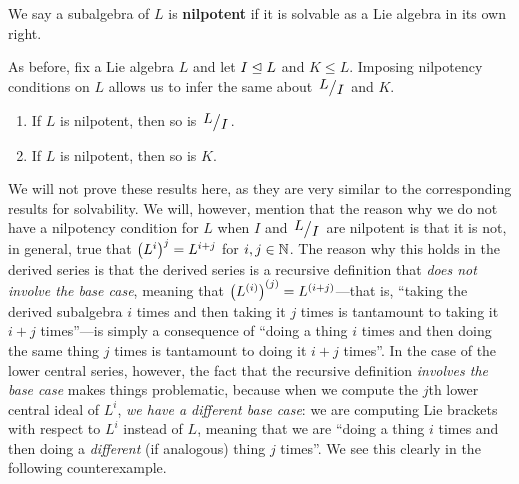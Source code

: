 \begin{boxdefinition}
    We say a subalgebra of $L$ is \textbf{nilpotent} if it is solvable as a Lie algebra in its own right.
\end{boxdefinition}

As before, fix a Lie algebra $L$ and let $I \trianglelefteq L$ and $K \leq L$. Imposing nilpotency conditions on $L$ allows us to infer the same about $\quotient{L}{I}$ and $K$.

\begin{boxproposition}
    \hfill
    \begin{enumerate}[label = \normalfont\arabic*., noitemsep]
        \item If $L$ is nilpotent, then so is $\quotient{L}{I}$.
        \item If $L$ is nilpotent, then so is $K$.
    \end{enumerate}
\end{boxproposition}

We will not prove these results here, as they are very similar to the corresponding results for solvability. We will, however, mention that the reason why we do not have a nilpotency condition for $L$ when $I$ and $\quotient{L}{I}$ are nilpotent is that it is not, in general, true that $\left( L^i \right)^j = L^{i + j}$ for $i, j \in \mathbb{N}$. The reason why this holds in the derived series is that the derived series is a recursive definition that \textit{does not involve the base case}, meaning that $\left( L^{(i)} \right)^{(j)} = L^{\left( i + j \right)}$---that is, ``taking the derived subalgebra $i$ times and then taking it $j$ times is tantamount to taking it $i + j$ times''---is simply a consequence of ``doing a thing $i$ times and then doing the same thing $j$ times is tantamount to doing it $i + j$ times''. In the case of the lower central series, however, the fact that the recursive definition \textit{involves the base case} makes things problematic, because when we compute the $j$th lower central ideal of $L^i$, \textit{we have a different base case}: we are computing Lie brackets with respect to $L^i$ instead of $L$, meaning that we are ``doing a thing $i$ times and then doing a \textit{different} (if analogous) thing $j$ times''. We see this clearly in the following counterexample.

